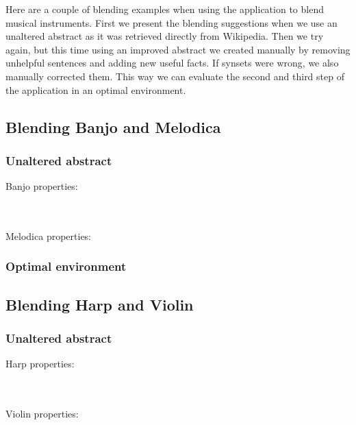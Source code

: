 Here are a couple of blending examples when using the application to blend musical instruments. First we present the blending suggestions when we use an unaltered abstract as it was retrieved directly from Wikipedia. Then we try again, but this time using an improved abstract we created manually by removing unhelpful sentences and adding new useful facts. If synsets were wrong, we also manually corrected them. This way we can evaluate the second and third step of the application in an optimal environment.

\subsection{Blending Banjo and Melodica}

\subsubsection{Unaltered abstract}

Banjo properties:

\noindent{}
\\\\Melodica properties:

\noindent{}

\subsubsection{Optimal environment}
		



\subsection{Blending Harp and Violin }

\subsubsection{Unaltered abstract}

Harp properties:

\noindent{}
\\\\Violin properties:

